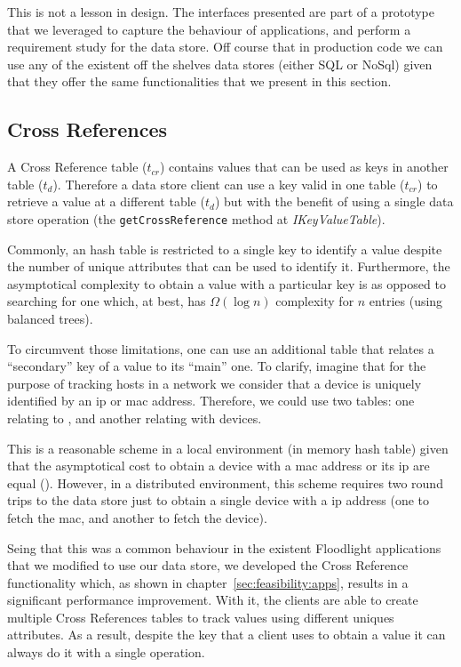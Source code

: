 This is not a lesson in design. The interfaces presented are part of a prototype that we leveraged to capture the behaviour of applications, and perform a requirement study for the data store. Off course that in production code we can use any of the existent off the shelves data stores (either SQL or NoSql) given that they offer the same functionalities that we present in this section. 
\label{sec:heimdall:key-value}

\subsection{Cross References} 
\label{sec:heimdall:cross-references}
A Cross Reference table ($t_{cr}$) contains values that can be used as keys in another table ($t_{d}$). 
Therefore a data store client can use a key valid in  one table ($t_{cr}$) to retrieve a value at  a different table ($t_{d}$) but with the benefit of using a  single data store operation (the \texttt{getCrossReference} method at \emph{IKeyValueTable}). 

Commonly, an hash table is restricted to a single key to identify a value despite the  number of unique attributes  that can be used to identify it. 
Furthermore, the asymptotical complexity to obtain a value with a particular key is  as opposed to searching for one which, at best, has $\Omega(\log n)$ complexity for $n$ entries (using balanced trees). 

To circumvent those limitations, one can use an additional table that relates a ``secondary'' key of a value to its ``main'' one. 
To clarify, imagine that for the purpose of tracking hosts in a network we consider that a device is uniquely identified by an \gls{ip} or \gls{mac} address. 
Therefore, we could use two tables: one relating  to  , and another relating  with devices.

This is a reasonable scheme in a local environment (in memory hash table) given that the asymptotical cost to obtain a device with 
a \gls{mac} address or its \gls{ip}  are equal (). 
However, in a distributed environment, this scheme requires two round trips to the data store just to obtain a single device with a \gls{ip} address (one to fetch the \gls{mac}, and another to fetch the device). 

Seing that this was a common behaviour in the existent Floodlight applications that we modified to use our data store, we developed the Cross Reference functionality which, as shown in chapter~\ref{sec:feasibility:apps}, results in a significant performance improvement. 
With it, the clients are able to create multiple Cross References tables to track values using different uniques attributes. 
As a result, despite the key that a client uses to obtain a value it can always do it with a single operation. 


